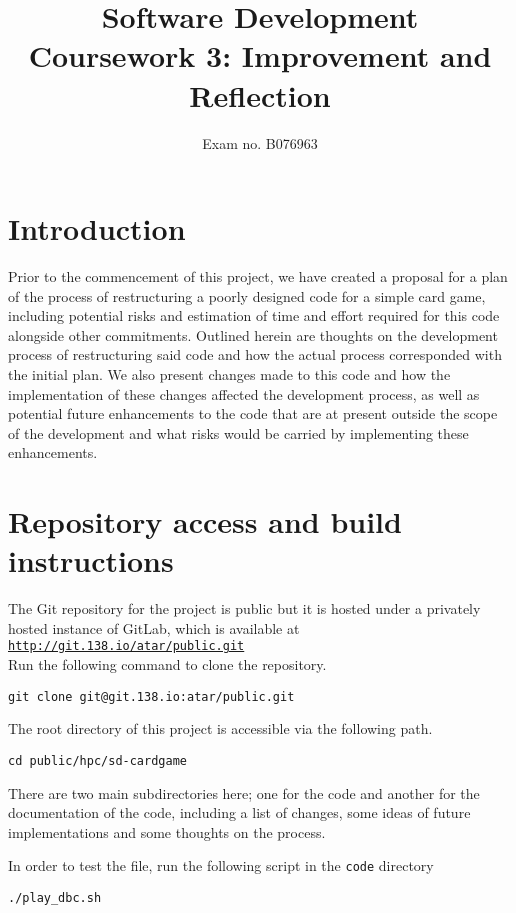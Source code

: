 \documentclass[12pt,a4paper,tightenlines]{article}
\begin{document}
\title{Software Development\\Coursework 3: Improvement and Reflection}
\author{Exam no. B076963}
\date{}
\makeEPCCtitle
\tableofcontents
\listoftables
\newpage
\section{Introduction}
Prior to the commencement of this project, we have created a proposal for
a plan of the process of restructuring a poorly designed code for a simple
card game, including potential risks and estimation of time and effort
required for this code alongside other commitments.
Outlined herein are thoughts on the development process of restructuring
said code and how the actual process corresponded with the 
initial plan. We also present changes made to this code and how the 
implementation of these changes affected the development process, as 
well as potential future enhancements to the code that are at present
outside the scope of the development and what risks would be carried by
implementing these enhancements.

\section{Repository access and build instructions}
The Git repository for the project is public but it is hosted under a
privately hosted instance of GitLab, which is available at 
\texttt{\href{http://git.138.io/atar/public.git}{http://git.138.io/atar/public.git}}\\
Run the following command to clone the repository.
\begin{lstlisting}
git clone git@git.138.io:atar/public.git
\end{lstlisting}

The root directory of this project is accessible via the following 
path.
\begin{lstlisting}
cd public/hpc/sd-cardgame
\end{lstlisting}

There are two main subdirectories here; one for the code and another for 
the documentation of the code, including a list of changes, some ideas
of future implementations and some thoughts on the process.

In order to test the file, run the following script in the \texttt{code}
directory 
\begin{lstlisting}
./play_dbc.sh
\end{lstlisting}
\end{document}
